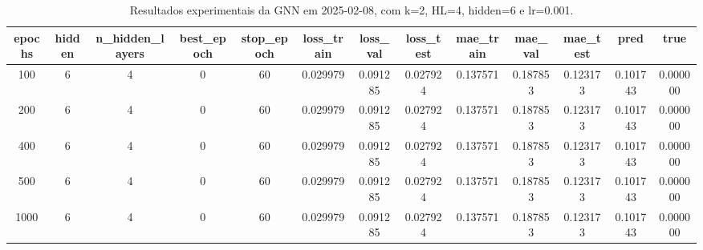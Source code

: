 \begin{table}[h]
\centering
\caption{Resultados experimentais da GNN em 2025-02-08, com k=2, HL=4, hidden=6 e lr=0.001.}
\label{tab:gnn_results_k2_hl4_h6_d20250208}
\begin{tabular}{ccccccccccccc}
\toprule
epochs & hidden & n\_hidden\_layers & best\_epoch & stop\_epoch & loss\_train & loss\_val & loss\_test & mae\_train & mae\_val & mae\_test & pred & true \\
\midrule
100 & 6 & 4 & 0 & 60 & 0.029979 & 0.091285 & 0.027924 & 0.137571 & 0.187853 & 0.123173 & 0.101743 & 0.000000 \\
200 & 6 & 4 & 0 & 60 & 0.029979 & 0.091285 & 0.027924 & 0.137571 & 0.187853 & 0.123173 & 0.101743 & 0.000000 \\
400 & 6 & 4 & 0 & 60 & 0.029979 & 0.091285 & 0.027924 & 0.137571 & 0.187853 & 0.123173 & 0.101743 & 0.000000 \\
500 & 6 & 4 & 0 & 60 & 0.029979 & 0.091285 & 0.027924 & 0.137571 & 0.187853 & 0.123173 & 0.101743 & 0.000000 \\
1000 & 6 & 4 & 0 & 60 & 0.029979 & 0.091285 & 0.027924 & 0.137571 & 0.187853 & 0.123173 & 0.101743 & 0.000000 \\
\bottomrule
\end{tabular}
\end{table}
